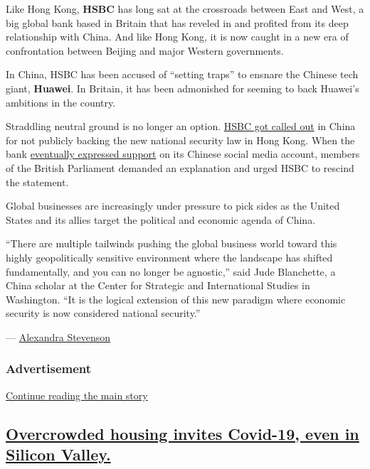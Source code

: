 Like Hong Kong, \textbf{HSBC} has long sat at the crossroads between
East and West, a big global bank based in Britain that has reveled in
and profited from its deep relationship with China. And like Hong Kong,
it is now caught in a new era of confrontation between Beijing and major
Western governments.

In China, HSBC has been accused of ``setting traps'' to ensnare the
Chinese tech giant, \textbf{Huawei}. In Britain, it has been admonished
for seeming to back Huawei's ambitions in the country.

Straddling neutral ground is no longer an option.
\href{https://www.nytimes3xbfgragh.onion/2020/05/31/business/hong-kong-china-business.html}{HSBC
got called out} in China for not publicly backing the new national
security law in Hong Kong. When the bank
\href{https://www.nytimes3xbfgragh.onion/2020/06/03/business/china-hong-kong-damage.html}{eventually
expressed support} on its Chinese social media account, members of the
British Parliament demanded an explanation and urged HSBC to rescind the
statement.

Global businesses are increasingly under pressure to pick sides as the
United States and its allies target the political and economic agenda of
China.

``There are multiple tailwinds pushing the global business world toward
this highly geopolitically sensitive environment where the landscape has
shifted fundamentally, and you can no longer be agnostic,'' said Jude
Blanchette, a China scholar at the Center for Strategic and
International Studies in Washington. ``It is the logical extension of
this new paradigm where economic security is now considered national
security.''

---
\href{https://www.nytimes3xbfgragh.onion/by/alexandra-stevenson}{Alexandra
Stevenson}

\hypertarget{advertisement-2}{%
\subsubsection{Advertisement}\label{advertisement-2}}

\protect\hyperlink{after-dfp-ad-mid3}{Continue reading the main story}

\hypertarget{overcrowded-housing-invites-covid-19-even-in-silicon-valley}{%
\subsection{\texorpdfstring{\protect\hyperlink{overcrowded-housing-invites-covid-19-even-in-silicon-valley}{Overcrowded
housing invites Covid-19, even in Silicon
Valley.}}{Overcrowded housing invites Covid-19, even in Silicon Valley.}}\label{overcrowded-housing-invites-covid-19-even-in-silicon-valley}}

